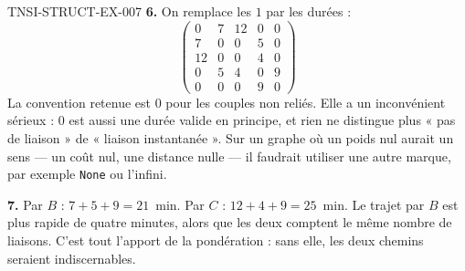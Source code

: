 \begin{corrige}{TNSI-STRUCT-EX-007}
\textbf{6.} On remplace les $1$ par les durées :
\[
  \begin{pmatrix}
    0&7&12&0&0\\
    7&0&0&5&0\\
    12&0&0&4&0\\
    0&5&4&0&9\\
    0&0&0&9&0
  \end{pmatrix}
\]
La convention retenue est $0$ pour les couples non reliés. Elle a un
inconvénient sérieux : $0$ est aussi une durée valide en principe, et rien ne
distingue plus « pas de liaison » de « liaison instantanée ». Sur un graphe où
un poids nul aurait un sens — un coût nul, une distance nulle — il faudrait
utiliser une autre marque, par exemple \lstinline{None} ou l'infini.

\textbf{7.} Par $B$ : $7+5+9=21$~min. Par $C$ : $12+4+9=25$~min. Le trajet par
$B$ est plus rapide de quatre minutes, alors que les deux comptent le même
nombre de liaisons. C'est tout l'apport de la pondération : sans elle, les deux
chemins seraient indiscernables.
\end{corrige}
